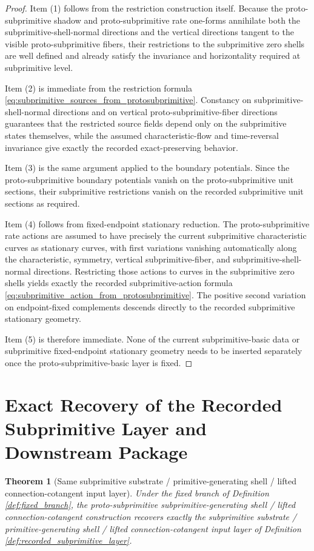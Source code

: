 \documentclass[11pt]{article}
\newtheorem{theorem}{Theorem}
\begin{document}
\begin{proof}
Item (1) follows from the restriction construction itself. Because the proto-subprimitive shadow and proto-subprimitive rate one-forms annihilate both the subprimitive-shell-normal directions and the vertical directions tangent to the visible proto-subprimitive fibers, their restrictions to the subprimitive zero shells are well defined and already satisfy the invariance and horizontality required at subprimitive level.

Item (2) is immediate from the restriction formula \eqref{eq:subprimitive_sources_from_protosubprimitive}. Constancy on subprimitive-shell-normal directions and on vertical proto-subprimitive-fiber directions guarantees that the restricted source fields depend only on the subprimitive states themselves, while the assumed characteristic-flow and time-reversal invariance give exactly the recorded exact-preserving behavior.

Item (3) is the same argument applied to the boundary potentials. Since the proto-subprimitive boundary potentials vanish on the proto-subprimitive unit sections, their subprimitive restrictions vanish on the recorded subprimitive unit sections as required.

Item (4) follows from fixed-endpoint stationary reduction. The proto-subprimitive rate actions are assumed to have precisely the current subprimitive characteristic curves as stationary curves, with first variations vanishing automatically along the characteristic, symmetry, vertical subprimitive-fiber, and subprimitive-shell-normal directions. Restricting those actions to curves in the subprimitive zero shells yields exactly the recorded subprimitive-action formula \eqref{eq:subprimitive_action_from_protosubprimitive}. The positive second variation on endpoint-fixed complements descends directly to the recorded subprimitive stationary geometry.

Item (5) is therefore immediate. None of the current subprimitive-basic data or subprimitive fixed-endpoint stationary geometry needs to be inserted separately once the proto-subprimitive-basic layer is fixed.
\end{proof}

\section{Exact Recovery of the Recorded Subprimitive Layer and Downstream Package}

\begin{theorem}[Same subprimitive substrate / primitive-generating shell / lifted connection-cotangent input layer]
\label{thm:same_subprimitive_input}
Under the fixed branch of Definition \ref{def:fixed_branch}, the proto-subprimitive subprimitive-generating shell / lifted connection-cotangent construction recovers exactly the subprimitive substrate / primitive-generating shell / lifted connection-cotangent input layer of Definition \ref{def:recorded_subprimitive_layer}.
\end{theorem}
\end{document}
